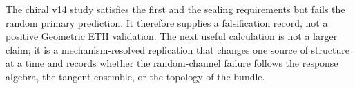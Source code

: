 The chiral v14 study satisfies the first and the sealing requirements but fails
the random primary prediction.  It therefore supplies a falsification record,
not a positive Geometric ETH validation.  The next useful calculation is not a
larger claim; it is a mechanism-resolved replication that changes one source
of structure at a time and records whether the random-channel failure follows
the response algebra, the tangent ensemble, or the topology of the bundle.
